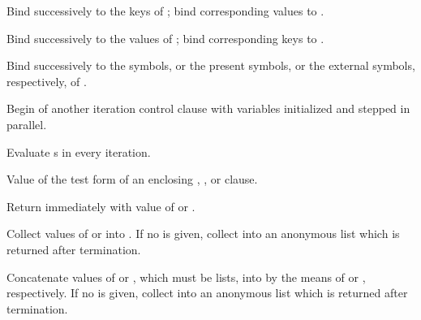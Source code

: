 \begin{LIST}{1cm}
\begin{LIST}{.5cm}
\begin{LIST}{.5cm}
      \begin{LIST}{.5cm}

        {
        Bind  successively to the keys of ; bind corresponding values to .
        }

        {
        Bind  successively to the values of ; bind corresponding keys to .
        }

        {
        Bind  successively to the symbols, or the present symbols, or the external symbols, respectively, of .
        }

      \end{LIST}
    \end{LIST}
    
    {
    Begin of another iteration control clause with variables initialized and stepped in parallel.
    }

    {
    Evaluate s in every iteration.
    }

    {
      Value of the test form of an enclosing , ,
      or  clause.
    }

    {
    Return immediately with value of  or .
    }

    {
    Collect values of  or  into . If no  is given, collect into an anonymous list
    which is returned after termination.
    }

    {
    Concatenate values of  or , which must be lists, into  by the means of  
    or , respectively.  If no  is given, collect into an anonymous list
    which is returned after termination.
    }


\end{LIST}
\end{LIST}
